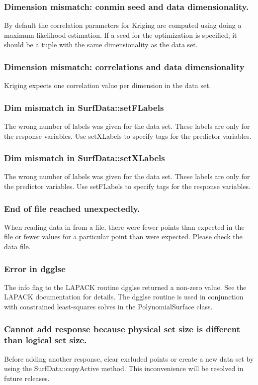 \documentclass{article}
\begin{document}
\subsubsection{Dimension mismatch: conmin seed and data dimensionality.}
By default the correlation parameters for Kriging are computed using doing a maximum likelihood estimation.  If a seed for the optimization is specified, it should be a tuple with the same dimensionality as the data set.

\subsubsection{Dimension mismatch: correlations and data dimensionality}
Kriging expects one correlation value per dimension in the data set.

\subsubsection{Dim mismatch in SurfData::setFLabels}
The wrong number of labels was given for the data set.  These labels are only for the response variables.  Use setXLabels to specify tags for the predictor variables.

\subsubsection{Dim mismatch in SurfData::setXLabels}
The wrong number of labels was given for the data set.  These labels are only for the predictor variables.  Use setFLabels to specify tags for the response variables.

\subsubsection{End of file reached unexpectedly.}
When reading data in from a file, there were fewer points than expected in the file or fewer values for a particular point than were expected.  Please check the data file.

\subsubsection{Error in dgglse}
The info flag to the LAPACK routine dgglse returned a non-zero value.  See the LAPACK documentation for details.  The dgglse routine is used in conjunction with constrained least-squares solves in the PolynomialSurface class.

\subsubsection{Cannot add response because physical set size is different than logical set size.}
Before adding another response, clear excluded points or create a new data set by using the SurfData::copyActive method.  This inconvenience will be resolved in future releases.
\end{document}
